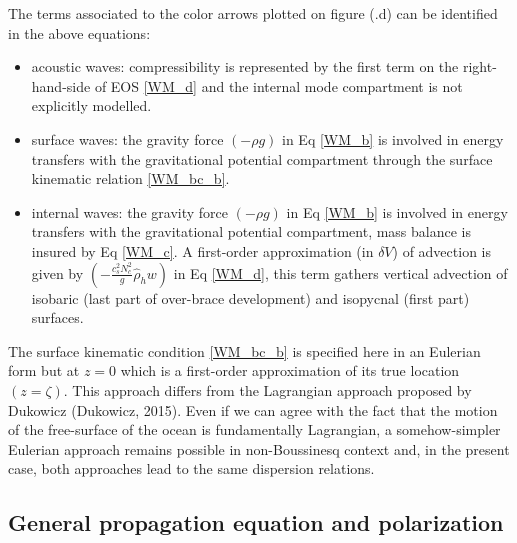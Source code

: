 \documentclass[a4paper,11pt]{article}
\begin{document}
The terms associated to the color arrows plotted on figure (.d) can be identified in the above equations:
\begin{itemize}
	\item acoustic waves: compressibility is represented by the first term on the right-hand-side of EOS \ref{WM_d} and the internal mode compartment is not explicitly modelled.
	\item surface waves: the gravity force $(-\rho g)$ in Eq \ref{WM_b} is involved in energy transfers with the gravitational potential compartment through the surface kinematic relation \ref{WM_bc_b}.
	\item internal waves: the gravity force $(-\rho g)$ in Eq \ref{WM_b} is involved in energy transfers with the gravitational potential compartment, mass balance is insured by Eq \ref{WM_c}. A first-order approximation (in $\delta V$) of advection is given by $(-\frac{c_s^2 N_c^2}{g} \hat{\rho}_h w)$ in Eq \ref{WM_d}, this term gathers vertical advection of isobaric (last part of over-brace development) and isopycnal (first part) surfaces.
\end{itemize}
The surface kinematic condition \ref{WM_bc_b} is specified here in an Eulerian form but at $z=0$ which is a first-order approximation of its true location $(z=\zeta)$. This approach differs from the Lagrangian approach proposed by Dukowicz (Dukowicz, 2015). Even if we can agree with the fact that the motion of the free-surface of the ocean is fundamentally Lagrangian, a somehow-simpler Eulerian approach remains possible in non-Boussinesq context and, in the present case, both approaches lead to the same dispersion relations.



\subsection{General propagation equation and polarization}
\end{document}

